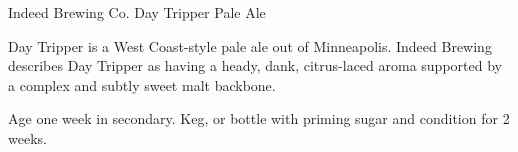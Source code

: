 \begin{recipie}{Indeed Brewing Co. Day Tripper Pale Ale}

\begin{aboutblock}
Day Tripper is a West Coast-style pale ale out of Minneapolis. Indeed Brewing describes Day
Tripper as having a heady, dank, citrus-laced aroma supported by a complex and subtly sweet
malt backbone.
\end{aboutblock}


\begin{methodandtiming}
 
\begin{mashsteps}
\end{mashsteps}

\begin{fermentationsteps}
\end{fermentationsteps}

\begin{directions}
Age one week in secondary. Keg, or bottle with  priming sugar and condition
for 2 weeks.
\end{directions}

\end{methodandtiming}

\pagebreak

\begin{ingredientsblock}

\begin{malts}

\end{malts}

\begin{hops}

\end{hops}

\begin{yeasts}
\end{yeasts}

\end{ingredientsblock}

\end{recipie}

